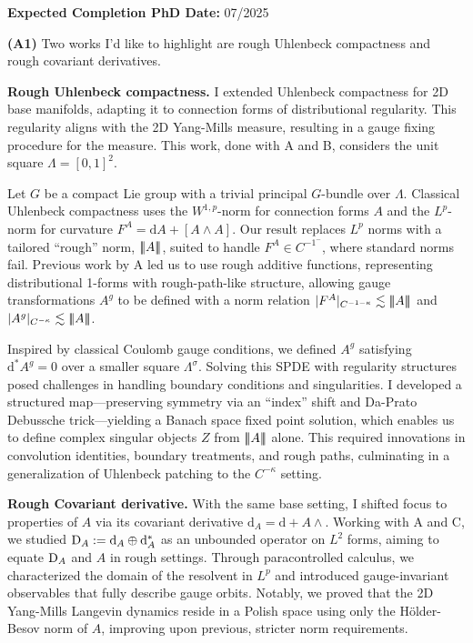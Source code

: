 \documentclass[./Research_statement.tex]{subfiles}
\begin{document}
\vspace*{-2cm}
\noindent \textbf{Expected Completion PhD Date:} 07/2025
\vspace{0.75cm}
\medskip 


\noindent \textbf{(A1)} Two works I'd like to highlight are rough Uhlenbeck compactness and rough covariant derivatives.  

\vspace{2pt}

\noindent \textbf{Rough Uhlenbeck compactness.}  
I extended Uhlenbeck compactness for 2D base manifolds, adapting it to connection forms of distributional regularity. This regularity aligns with the 2D Yang-Mills measure, resulting in a gauge fixing procedure for the measure. This work, done with A and B, considers the unit square $\Lambda=[0,1]^2$. 

Let \( G \) be a compact Lie group with a trivial principal \( G \)-bundle over \( \Lambda \). Classical Uhlenbeck compactness uses the \( W^{1,p} \)-norm for connection forms \( A \) and the \( L^p \)-norm for curvature \( F^A = \mathrm{d}A + [A \wedge A] \). Our result replaces \( L^p \) norms with a tailored “rough” norm, \({\left\vert\kern-0.4ex\left\vert\kern-0.4ex\left\vert A \right\vert\kern-0.4ex\right\vert\kern-0.4ex\right\vert}\), suited to handle \( F^A \in C^{-1^-} \), where standard norms fail. Previous work by A led us to use rough additive functions, representing distributional 1-forms with rough-path-like structure, allowing gauge transformations \( A^g \) to be defined with a norm relation \( |F^A|_{C^{-1-\kappa}} \lesssim {\left\vert\kern-0.4ex\left\vert\kern-0.4ex\left\vert A \right\vert\kern-0.4ex\right\vert\kern-0.4ex\right\vert} \) and \( |A^g|_{C^{-\kappa}} \lesssim {\left\vert\kern-0.4ex\left\vert\kern-0.4ex\left\vert A \right\vert\kern-0.4ex\right\vert\kern-0.4ex\right\vert} \).

Inspired by classical Coulomb gauge conditions, we defined \( A^g \) satisfying \( \mathrm{d}^* A^g = 0 \) over a smaller square \( \Lambda^\sigma \). Solving this SPDE with regularity structures posed challenges in handling boundary conditions and singularities. I developed a structured map—preserving symmetry via an “index” shift and Da-Prato Debussche trick—yielding a Banach space fixed point solution, which enables us to define complex singular objects \( Z \) from \({\left\vert\kern-0.4ex\left\vert\kern-0.4ex\left\vert A \right\vert\kern-0.4ex\right\vert\kern-0.4ex\right\vert}\) alone. This required innovations in convolution identities, boundary treatments, and rough paths, culminating in a generalization of Uhlenbeck patching to the \( C^{-\kappa} \) setting.

\vspace{2pt}

\noindent \textbf{Rough Covariant derivative.}  
With the same base setting, I shifted focus to properties of \( A \) via its covariant derivative \( \mathrm{d}_A = \mathrm{d} + A \wedge \). Working with A and C, we studied \( \mathrm{D}_A := \mathrm{d}_A \oplus \mathrm{d}_A^* \) as an unbounded operator on \( L^2 \) forms, aiming to equate \( \mathrm{D}_A \) and \( A \) in rough settings. Through paracontrolled calculus, we characterized the domain of the resolvent in \( L^p \) and introduced gauge-invariant observables that fully describe gauge orbits. Notably, we proved that the 2D Yang-Mills Langevin dynamics reside in a Polish space using only the Hölder-Besov norm of \( A \), improving upon previous, stricter norm requirements.
\end{document}
